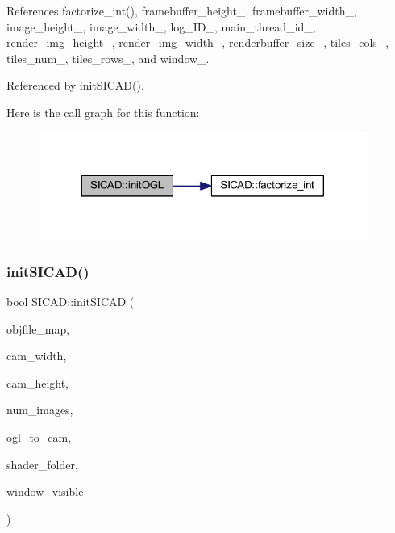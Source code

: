 References factorize\+\_\+int(), framebuffer\+\_\+height\+\_\+, framebuffer\+\_\+width\+\_\+, image\+\_\+height\+\_\+, image\+\_\+width\+\_\+, log\+\_\+\+I\+D\+\_\+, main\+\_\+thread\+\_\+id\+\_\+, render\+\_\+img\+\_\+height\+\_\+, render\+\_\+img\+\_\+width\+\_\+, renderbuffer\+\_\+size\+\_\+, tiles\+\_\+cols\+\_\+, tiles\+\_\+num\+\_\+, tiles\+\_\+rows\+\_\+, and window\+\_\+.



Referenced by init\+S\+I\+C\+A\+D().

Here is the call graph for this function\+:
\nopagebreak
\begin{figure}[H]
\begin{center}
\leavevmode
\includegraphics[width=305pt]{classSICAD_a102619690ab32e300405d22d52e36a5e_cgraph}
\end{center}
\end{figure}
\mbox{\label{classSICAD_a04e1291dc1a51b2dee87dbe9a5b3a316}} 
\subsubsection{\texorpdfstring{init\+S\+I\+C\+A\+D()}{initSICAD()}\hspace{0.1cm}{\footnotesize\ttfamily [1/2]}}
{\footnotesize\ttfamily bool S\+I\+C\+A\+D\+::init\+S\+I\+C\+AD (\begin{DoxyParamCaption}\item[{const \mbox{\hyperlink{classSICAD_a9e1e1460d4c0f331b4fd015aae4dd721}{Model\+Path\+Container}} \&}]{objfile\+\_\+map,  }\item[{const G\+Lsizei}]{cam\+\_\+width,  }\item[{const G\+Lsizei}]{cam\+\_\+height,  }\item[{const G\+Lint}]{num\+\_\+images,  }\item[{const std\+::vector$<$ float $>$ \&}]{ogl\+\_\+to\+\_\+cam,  }\item[{const std\+::string \&}]{shader\+\_\+folder,  }\item[{const bool}]{window\+\_\+visible }\end{DoxyParamCaption})}



